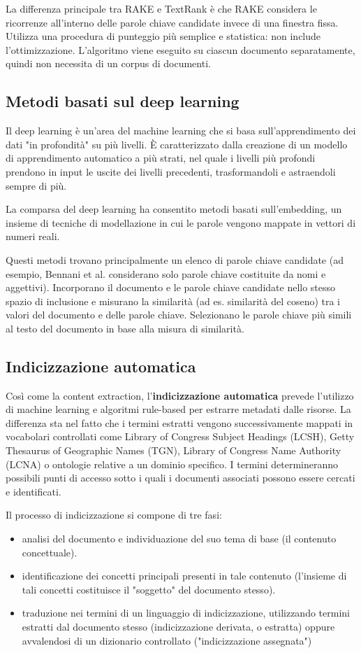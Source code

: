 La differenza principale tra RAKE e TextRank è che RAKE considera le ricorrenze all'interno delle parole chiave candidate invece di una finestra fissa. Utilizza una procedura di punteggio più semplice e statistica: non include l'ottimizzazione. L'algoritmo viene eseguito su ciascun documento separatamente, quindi non necessita di un corpus di documenti.

\subsection{Metodi basati sul deep learning}
Il deep learning è un’area del machine learning che si basa sull’apprendimento dei dati "in profondità" su più livelli. È caratterizzato dalla creazione di un modello di apprendimento automatico a più strati, nel quale i livelli più profondi prendono in input le uscite dei livelli precedenti, trasformandoli e astraendoli sempre di più.

La comparsa del deep learning ha consentito metodi basati sull'embedding, un insieme di tecniche di modellazione in cui le parole vengono mappate in vettori di numeri reali. 

Questi metodi trovano principalmente un elenco di parole chiave candidate (ad esempio, Bennani et al. considerano solo parole chiave costituite da nomi e aggettivi). Incorporano il documento e le parole chiave candidate nello stesso spazio di inclusione e misurano la similarità (ad es. similarità del coseno) tra i valori del documento e delle parole chiave. Selezionano le parole chiave più simili al testo del documento in base alla misura di similarità.

\subsection{Indicizzazione automatica}
Così come la content extraction, l'\textbf{indicizzazione automatica} prevede l'utilizzo di machine learning e algoritmi rule-based per estrarre metadati dalle risorse. La differenza sta nel fatto che i termini estratti vengono successivamente mappati in vocabolari controllati come Library of Congress Subject Headings (LCSH), Getty Thesaurus of Geographic Names (TGN), Library of Congress Name Authority (LCNA) o ontologie relative a un dominio specifico. I termini determineranno possibili punti di accesso sotto i quali i documenti associati possono essere cercati e identificati.

Il processo di indicizzazione si compone di tre fasi:
\begin{itemize}
\item analisi del documento e individuazione del suo tema di base (il contenuto concettuale).
\item identificazione dei concetti principali presenti in tale contenuto (l'insieme di tali concetti costituisce il "soggetto" del documento stesso).
\item traduzione nei termini di un linguaggio di indicizzazione, utilizzando termini estratti dal documento stesso (indicizzazione derivata, o estratta) oppure avvalendosi di un dizionario controllato ("indicizzazione assegnata")
\end{itemize}

